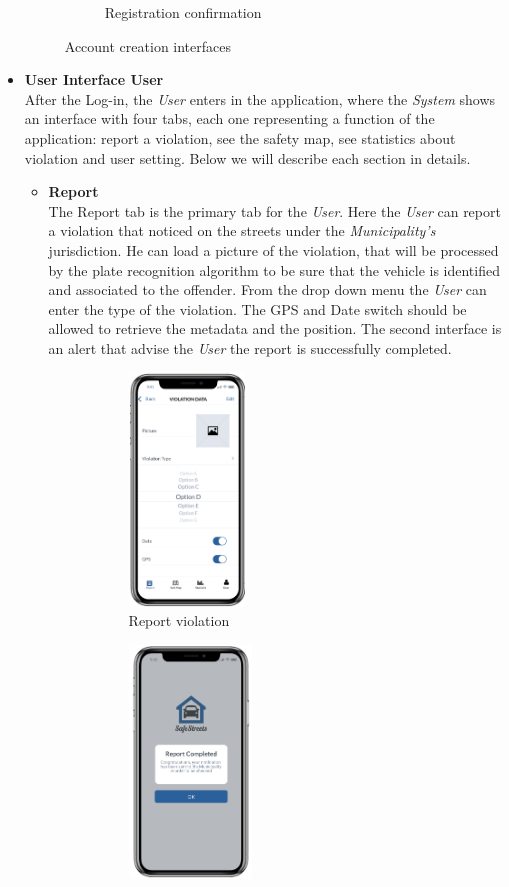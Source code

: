 \documentclass {article}
\begin{document}
\begin{itemize}
\begin{figure} [H]
\begin{subfigure}{.4\textwidth}
				\caption{Registration confirmation}
			\end{subfigure}
			\caption{Account creation interfaces} 
			\end{figure}
		\item {\bf User Interface User} \\
		After the Log-in, the {\it User} enters in the application, where the {\it System} shows an interface with four tabs, each one representing a function of the application: report a violation, see the safety map, see statistics about violation and user setting. Below we will describe each section in details. 
			\begin{itemize}
			\item {\bf Report} \\
			The Report tab is the primary tab for the {\it User}. Here the {\it User} can report a violation that noticed on the streets under the {\it Municipality's} jurisdiction. He can load a picture of the violation, that will be processed by the plate recognition algorithm to be sure that the vehicle is identified and associated to the offender. From the drop down menu the {\it User} can enter the type of the violation. The GPS and Date switch should be allowed to retrieve the metadata and the position. The second interface is an alert that advise the {\it User} the report is successfully completed. 
			\begin{figure}[H]
				\centering
			\begin{subfigure}{.4\textwidth}
				\centering
				\includegraphics[height=6.2cm]{Images/Interfaces/user_report.png}
				\caption{Report violation}
			\end{subfigure}
			\begin{subfigure}{.4\textwidth}
				\centering
				\includegraphics[height=6.2cm]{Images/Interfaces/user_report_done.png}

\end{subfigure}
\end{figure}
\end{itemize}
\end{itemize}
\end{document}
